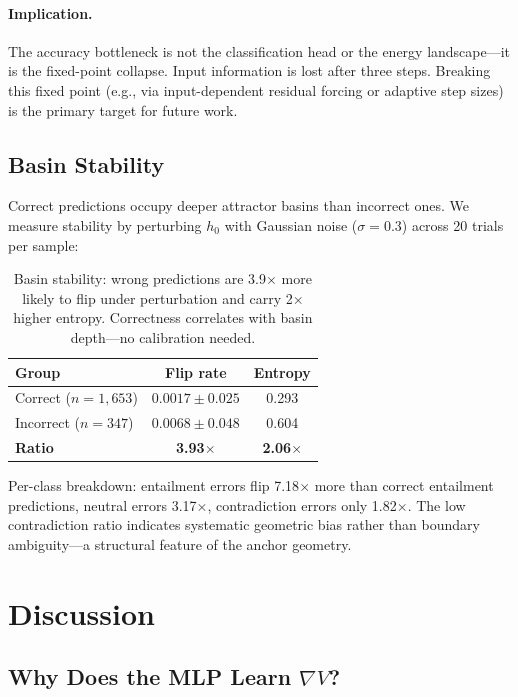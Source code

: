 \documentclass[11pt]{article}
\begin{document}
\paragraph{Implication.}
The accuracy bottleneck is not the classification head or the energy
landscape---it is the fixed-point collapse. Input information is lost
after three steps. Breaking this fixed point (e.g., via input-dependent
residual forcing or adaptive step sizes) is the primary target for
future work.

\subsection{Basin Stability}
\label{sec:stability}

Correct predictions occupy deeper attractor basins than incorrect ones.
We measure stability by perturbing $h_0$ with Gaussian noise
($\sigma = 0.3$) across 20 trials per sample:

\begin{table}[ht]
\centering
\begin{tabular}{@{}lcc@{}}
\toprule
Group & Flip rate & Entropy \\
\midrule
Correct ($n=1{,}653$) & $0.0017 \pm 0.025$ & 0.293 \\
Incorrect ($n=347$) & $0.0068 \pm 0.048$ & 0.604 \\
\textbf{Ratio} & \textbf{3.93$\times$} & \textbf{2.06$\times$} \\
\bottomrule
\end{tabular}
\caption{Basin stability: wrong predictions are 3.9$\times$ more likely
to flip under perturbation and carry 2$\times$ higher entropy.
Correctness correlates with basin depth---no calibration needed.}
\label{tab:stability}
\end{table}

Per-class breakdown: entailment errors flip 7.18$\times$ more than
correct entailment predictions, neutral errors 3.17$\times$,
contradiction errors only 1.82$\times$. The low contradiction ratio
indicates systematic geometric bias rather than boundary ambiguity---a
structural feature of the anchor geometry.

\section{Discussion}
\label{sec:discussion}

\subsection{Why Does the MLP Learn \texorpdfstring{$\nabla V$}{grad V}?}
\end{document}
